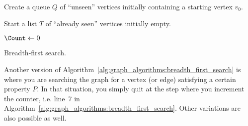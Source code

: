 \begin{algorithm}[!htpb]
\SetLine
\dontprintsemicolon  %
\BlankLine
Create a queue $Q$ of ``unseen'' vertices initially containing a
starting vertex $v_0$.\;

Start a list $T$ of ``already seen'' vertices initially empty.\;

$\Count \leftarrow 0$\;

\caption{Breadth-first search.}
\label{alg:graph_algorithms:breadth_first_search}
\end{algorithm}


Another version of
Algorithm~\ref{alg:graph_algorithms:breadth_first_search} is where you
are searching the graph for a vertex (or edge) satisfying a certain
property $P$. In that situation, you simply quit at the step where you
increment the counter, i.e. line~7 in
Algorithm~\ref{alg:graph_algorithms:breadth_first_search}. Other
variations are also possible as well.

